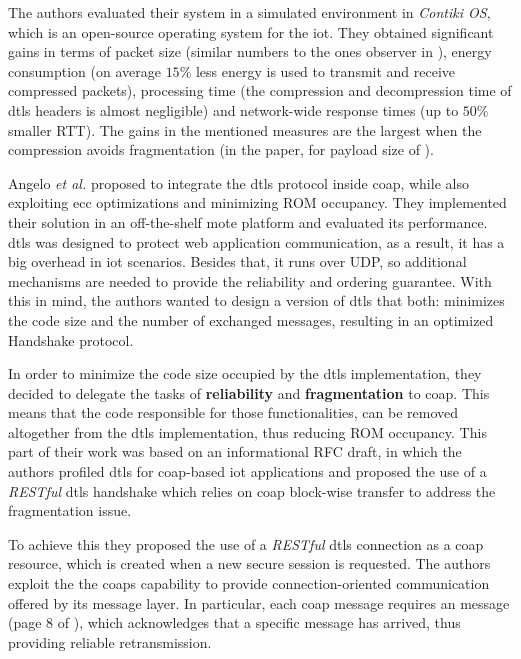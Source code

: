 \documentclass{llncs}
\begin{document}
The authors evaluated their system in a simulated environment in \textit{Contiki OS}\cite{ContikiT75:online}, which is an open-source operating system for the \gls{iot}.
They obtained significant gains in terms of packet size (similar numbers to the
ones observer in \cite{6LoWPANC53:online}), energy consumption (on average $15\%$ less
energy is used to transmit and receive compressed packets), processing time
(the compression and decompression time of \gls{dtls} headers is almost negligible)
and network-wide response times (up to $50\%$ smaller RTT). The
gains in the mentioned measures are the largest when the compression avoids
fragmentation (in the paper, for payload size of ).

Angelo \textit{et al.} \cite{Security5:online} proposed to integrate the \gls{dtls} protocol
inside \gls{coap}, while also exploiting \gls{ecc} optimizations and minimizing
ROM occupancy. They implemented their solution in an off-the-shelf mote platform
and evaluated its performance. \gls{dtls} was designed to protect web application communication, as a result,
it has a big overhead in \gls{iot} scenarios. Besides that, it runs over UDP,
so additional mechanisms are needed to provide the reliability and ordering
guarantee. With this in mind, the authors wanted to design a version of \gls{dtls}
that both: minimizes the code size and the number of exchanged messages, resulting
in an optimized Handshake protocol.

In order to minimize the code size occupied by the \gls{dtls} implementation, they
decided to delegate the tasks of \textbf{reliability} and \textbf{fragmentation} to
\gls{coap}. This means that the code responsible for those functionalities,
can be removed altogether from the \gls{dtls} implementation, thus reducing ROM
occupancy. This part of their work was based on an informational RFC draft\cite{I-D.keoh-dtls-profile-iot}, in which the
authors profiled \gls{dtls} for \gls{coap}-based \gls{iot} applications and proposed
the use of a \textit{RESTful} \gls{dtls} handshake which relies on \gls{coap} block-wise
transfer to address the fragmentation issue.

To achieve this they  proposed the use of a \textit{RESTful} \gls{dtls} connection as a \gls{coap} resource,
which is created when a new secure session is requested.
The authors exploit the the \gls{coap}s capability to provide connection-oriented
communication offered by its message layer. In particular, each 
\gls{coap} message requires an  message (page 8 of  \cite{RFC7252}),
which acknowledges that a specific  message has arrived, thus
providing reliable retransmission.
\end{document}
